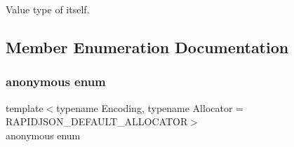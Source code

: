 Value type of itself. 



\subsection{Member Enumeration Documentation}
\mbox{\label{classGenericValue_a04e3cc12ba3721aad00063678d466912}} 
\subsubsection{\texorpdfstring{anonymous enum}{anonymous enum}}
{\footnotesize\ttfamily template$<$typename Encoding, typename Allocator = R\+A\+P\+I\+D\+J\+S\+O\+N\+\_\+\+D\+E\+F\+A\+U\+L\+T\+\_\+\+A\+L\+L\+O\+C\+A\+T\+OR$>$ \\
anonymous enum}

